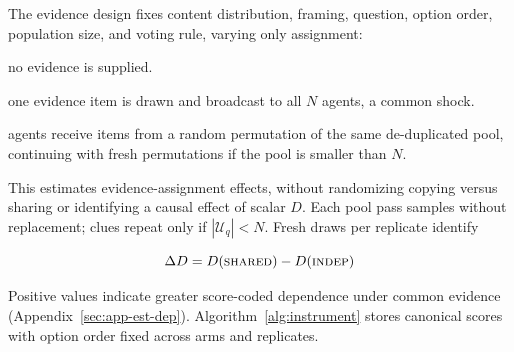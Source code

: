 \documentclass[11pt,a4paper]{article}
\theoremstyle{definition}
\newcommand{\Dep}{D}
\newcommand{\shared}{\textsc{shared}}
\newcommand{\indep}{\textsc{indep}}
\newcommand{\nocond}{\textsc{base}}
\begin{document}
The evidence design fixes content distribution, framing, question, option
order, population size, and voting rule, varying only assignment:

\begin{description}
\setlength{\itemsep}{0pt}
\setlength{\parsep}{0pt}
  \item[\nocond] no evidence is supplied.
  \item[\shared] one evidence item is drawn and broadcast to all $N$ agents, a
  common shock.
  \item[\indep] agents receive items from a random permutation of the same
  de-duplicated pool, continuing with fresh permutations if the pool is
  smaller than $N$.
\end{description}

This estimates evidence-assignment effects, without randomizing copying
versus sharing or identifying a causal effect of scalar $\Dep$. Each pool
pass samples without replacement; clues repeat only if $|\mathcal U_q|<N$.
Fresh draws per replicate identify

\begin{equation}
\Delta \Dep=\Dep(\shared)-\Dep(\indep)
\label{eq:dD}
\end{equation}

Positive values indicate greater score-coded dependence under common evidence
(Appendix~\ref{sec:app-est-dep}). Algorithm~\ref{alg:instrument} stores canonical
scores with option order fixed across arms and replicates.
\end{document}
